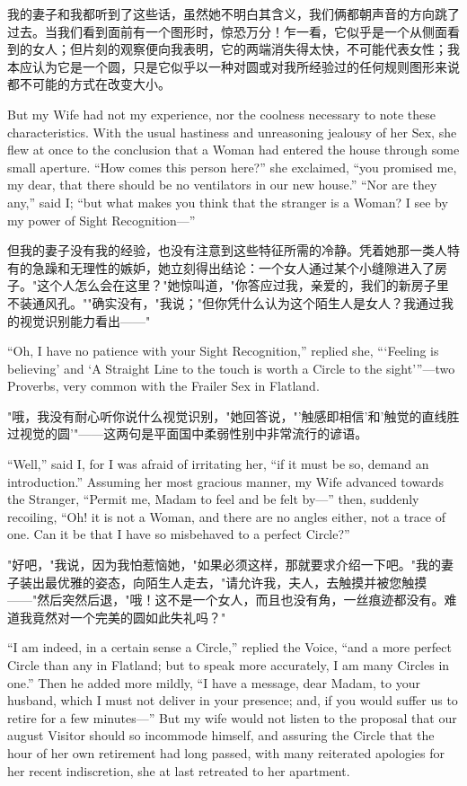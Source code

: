 \documentclass[12pt,UTF8]{ctexbook}
\begin{document}
我的妻子和我都听到了这些话，虽然她不明白其含义，我们俩都朝声音的方向跳了过去。当我们看到面前有一个图形时，惊恐万分！乍一看，它似乎是一个从侧面看到的女人；但片刻的观察便向我表明，它的两端消失得太快，不可能代表女性；我本应认为它是一个圆，只是它似乎以一种对圆或对我所经验过的任何规则图形来说都不可能的方式在改变大小。

But my Wife had not my experience, nor the coolness necessary to note these characteristics. With the usual hastiness and unreasoning jealousy of her Sex, she flew at once to the conclusion that a Woman had entered the house through some small aperture. ``How comes this person here?'' she exclaimed, ``you promised me, my dear, that there should be no ventilators in our new house.'' ``Nor are they any,'' said I; ``but what makes you think that the stranger is a Woman? I see by my power of Sight Recognition---''

但我的妻子没有我的经验，也没有注意到这些特征所需的冷静。凭着她那一类人特有的急躁和无理性的嫉妒，她立刻得出结论：一个女人通过某个小缝隙进入了房子。"这个人怎么会在这里？"她惊叫道，"你答应过我，亲爱的，我们的新房子里不装通风孔。""确实没有，"我说；"但你凭什么认为这个陌生人是女人？我通过我的视觉识别能力看出——"

``Oh, I have no patience with your Sight Recognition,'' replied she, ```Feeling is believing' and `A Straight Line to the touch is worth a Circle to the sight'''---two Proverbs, very common with the Frailer Sex in Flatland.

"哦，我没有耐心听你说什么视觉识别，"她回答说，"'触感即相信'和'触觉的直线胜过视觉的圆'"——这两句是平面国中柔弱性别中非常流行的谚语。

``Well,'' said I, for I was afraid of irritating her, ``if it must be so, demand an introduction.'' Assuming her most gracious manner, my Wife advanced towards the Stranger, ``Permit me, Madam to feel and be felt by---'' then, suddenly recoiling, ``Oh! it is not a Woman, and there are no angles either, not a trace of one. Can it be that I have so misbehaved to a perfect Circle?''

"好吧，"我说，因为我怕惹恼她，"如果必须这样，那就要求介绍一下吧。"我的妻子装出最优雅的姿态，向陌生人走去，"请允许我，夫人，去触摸并被您触摸——"然后突然后退，"哦！这不是一个女人，而且也没有角，一丝痕迹都没有。难道我竟然对一个完美的圆如此失礼吗？"

``I am indeed, in a certain sense a Circle,'' replied the Voice, ``and a more perfect Circle than any in Flatland; but to speak more accurately, I am many Circles in one.'' Then he added more mildly, ``I have a message, dear Madam, to your husband, which I must not deliver in your presence; and, if you would suffer us to retire for a few minutes---'' But my wife would not listen to the proposal that our august Visitor should so incommode himself, and assuring the Circle that the hour of her own retirement had long passed, with many reiterated apologies for her recent indiscretion, she at last retreated to her apartment.
\end{document}
